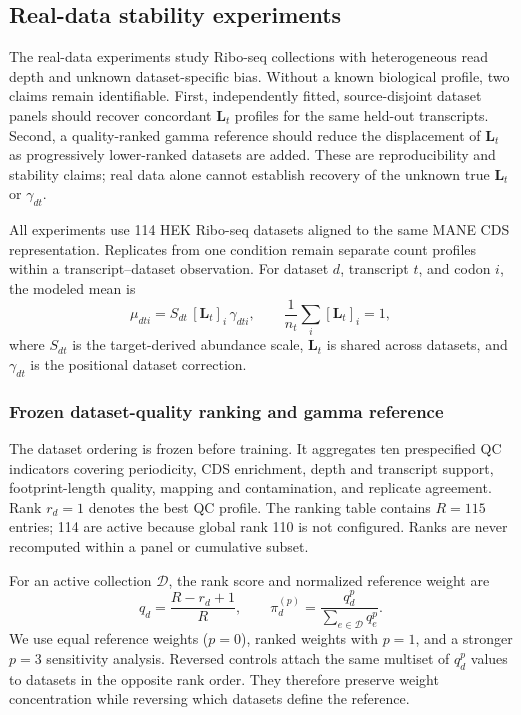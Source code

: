 \subsection{Real-data stability experiments}
\label{sec:real_stability_experiments}

The real-data experiments study Ribo-seq collections with heterogeneous read
depth and unknown dataset-specific bias.  Without a known biological profile,
two claims remain identifiable.  First, independently fitted, source-disjoint
dataset panels should recover concordant $\mathbf{L}_t$ profiles for the
same held-out transcripts.  Second, a quality-ranked gamma reference should
reduce the displacement of $\mathbf{L}_t$ as progressively lower-ranked
datasets are added.  These are reproducibility and stability claims; real data
alone cannot establish recovery of the unknown true $\mathbf{L}_t$ or
$\gamma_{dt}$.

All experiments use 114 HEK Ribo-seq datasets aligned to the same MANE CDS
representation.  Replicates from one condition remain separate count profiles
within a transcript--dataset observation.  For dataset $d$, transcript $t$, and
codon $i$, the modeled mean is
\begin{equation}
    \mu_{dti}=S_{dt}\,[\mathbf{L}_t]_i\,\gamma_{dti},
    \qquad
    \frac{1}{n_t}\sum_i [\mathbf{L}_t]_i=1,
    \label{eq:real_mean_decomposition}
\end{equation}
where $S_{dt}$ is the target-derived abundance scale,
$\mathbf{L}_t$ is shared across datasets, and $\gamma_{dt}$ is the
positional dataset correction.

\subsubsection{Frozen dataset-quality ranking and gamma reference}
\label{sec:real_quality_ranking}

The dataset ordering is frozen before training.  It aggregates ten
prespecified QC indicators covering periodicity, CDS enrichment, depth and
transcript support, footprint-length quality, mapping and contamination, and
replicate agreement.  Rank $r_d=1$ denotes the best QC profile.  The ranking
table contains $R=115$ entries; 114 are active because global rank 110 is not
configured.  Ranks are never recomputed within a panel or cumulative subset.

For an active collection $\mathcal D$, the rank score and normalized reference
weight are
\begin{equation}
    q_d=\frac{R-r_d+1}{R},
    \qquad
    \pi_d^{(p)}=\frac{q_d^p}{\sum_{e\in\mathcal D}q_e^p}.
    \label{eq:real_gamma_reference}
\end{equation}
We use equal reference weights ($p=0$), ranked weights with $p=1$, and a
stronger $p=3$ sensitivity analysis.  Reversed controls attach the same
multiset of $q_d^p$ values to datasets in the opposite rank order.  They
therefore preserve weight concentration while reversing which datasets define
the reference.

